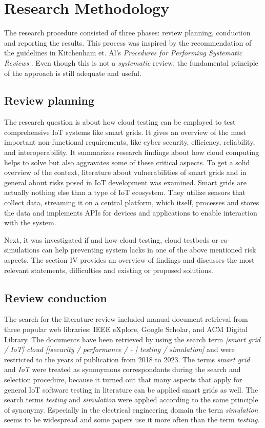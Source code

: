 \section{Research Methodology}
The research procedure consisted of three phases: review planning, conduction and reporting the results. This process was inspired by the recommendation of the guidelines in Kitchenham et. Al's \textit{Procedures for Performing Systematic Reviews} \cite{kitchenham2004procedures}. Even though this is not a \textit{systematic} review, the fundamental principle of the approach is still adequate and useful.

\subsection{Review planning}
The research question is about how cloud testing can be employed to test comprehensive IoT systems like smart grids. It gives an overview of the most important non-functional requirements, like cyber security, efficiency, reliability, and interoperability. It summarizes research findings about how cloud computing helps to solve but also aggravates some of these critical aspects. To get a solid overview of the context, literature about vulnerabilities of smart grids and in general about risks posed in IoT development was examined. Smart grids are actually nothing else than a type of IoT ecosystem. They utilize sensors that collect data, streaming it on a central platform, which itself, processes and stores the data and implements APIs for devices and applications to enable interaction with the system. 

Next, it was investigated if and how cloud testing, cloud testbeds or co-simulations can help preventing system lacks in one of the above mentioned risk aspects. The section IV provides an overview of findings and discusses the most relevant statements, difficulties and existing or proposed solutions.

\subsection{Review conduction}

The search for the literature review included manual document retrieval from three popular web libraries: IEEE eXplore, Google Scholar, and ACM Digital Library. The documents have been retrieved by using the search term \textit{[smart grid / IoT] cloud [[security / performance / - ] testing / simulation]} and were restricted to the years of publication from 2018 to 2023. The terms \textit{smart grid} and \textit{IoT} were treated as synonymous correspondants during the search and selection procedure, because it turned out that many aspects that apply for general IoT software testing in literature can be applied smart grids as well. The search terms \textit{testing} and \textit{simulation} were applied according to the same principle of synonymy. Especially in the electrical engineering domain the term \textit{simulation} seems to be widespread and some papers use it more often than the term \textit{testing}.


